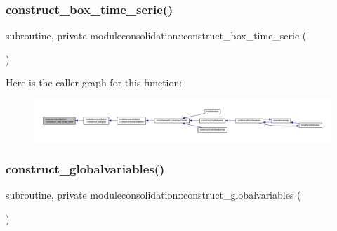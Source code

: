 \subsubsection{\texorpdfstring{construct\+\_\+box\+\_\+time\+\_\+serie()}{construct\_box\_time\_serie()}}
{\footnotesize\ttfamily subroutine, private moduleconsolidation\+::construct\+\_\+box\+\_\+time\+\_\+serie (\begin{DoxyParamCaption}{ }\end{DoxyParamCaption})\hspace{0.3cm}{\ttfamily [private]}}

Here is the caller graph for this function\+:\nopagebreak
\begin{figure}[H]
\begin{center}
\leavevmode
\includegraphics[width=350pt]{namespacemoduleconsolidation_a37594ccd5d2f08cccc42657f65ec2387_icgraph}
\end{center}
\end{figure}
\mbox{\label{namespacemoduleconsolidation_a4d351c8e79499df7d1edcdc11c64fd58}} 
\subsubsection{\texorpdfstring{construct\+\_\+globalvariables()}{construct\_globalvariables()}}
{\footnotesize\ttfamily subroutine, private moduleconsolidation\+::construct\+\_\+globalvariables (\begin{DoxyParamCaption}{ }\end{DoxyParamCaption})\hspace{0.3cm}{\ttfamily [private]}}

